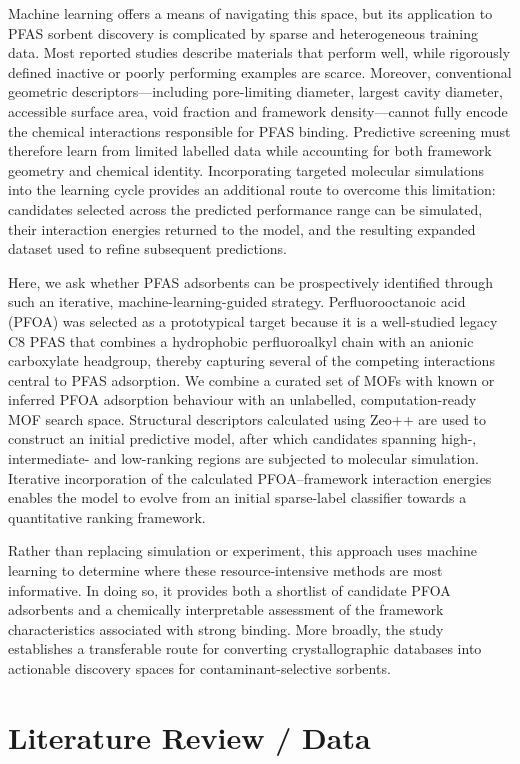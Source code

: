 \documentclass[twoside,twocolumn,9pt]{article}
\begin{document}
Machine learning offers a means of navigating this space, but its application to PFAS sorbent discovery is complicated by sparse and heterogeneous training data. Most reported studies describe materials that perform well, while rigorously defined inactive or poorly performing examples are scarce. Moreover, conventional geometric descriptors—including pore-limiting diameter, largest cavity diameter, accessible surface area, void fraction and framework density—cannot fully encode the chemical interactions responsible for PFAS binding. Predictive screening must therefore learn from limited labelled data while accounting for both framework geometry and chemical identity. Incorporating targeted molecular simulations into the learning cycle provides an additional route to overcome this limitation: candidates selected across the predicted performance range can be simulated, their interaction energies returned to the model, and the resulting expanded dataset used to refine subsequent predictions.

Here, we ask whether PFAS adsorbents can be prospectively identified through such an iterative, machine-learning-guided strategy. Perfluorooctanoic acid (PFOA) was selected as a prototypical target because it is a well-studied legacy C8 PFAS that combines a hydrophobic perfluoroalkyl chain with an anionic carboxylate headgroup, thereby capturing several of the competing interactions central to PFAS adsorption. We combine a curated set of MOFs with known or inferred PFOA adsorption behaviour with an unlabelled, computation-ready MOF search space. Structural descriptors calculated using Zeo++ are used to construct an initial predictive model, after which candidates spanning high-, intermediate- and low-ranking regions are subjected to molecular simulation. Iterative incorporation of the calculated PFOA–framework interaction energies enables the model to evolve from an initial sparse-label classifier towards a quantitative ranking framework.

Rather than replacing simulation or experiment, this approach uses machine learning to determine where these resource-intensive methods are most informative. In doing so, it provides both a shortlist of candidate PFOA adsorbents and a chemically interpretable assessment of the framework characteristics associated with strong binding. More broadly, the study establishes a transferable route for converting crystallographic databases into actionable discovery spaces for contaminant-selective sorbents.

\section{Literature Review / Data}
\end{document}
